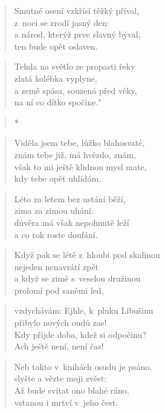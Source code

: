 \begin{verse}
Smutné osení vzkřísí těžký příval, \\
z~noci se zrodí jasný den: \\
a národ, kterýž prve slavný býval, \\
ten bude opět oslaven.
\end{verse}

\begin{verse}
Tehda na světlo ze propasti řeky \\
zlatá kolébka vyplyne, \\
a země spása, souzená před věky, \\
na ní co dítko spočine."
\end{verse}

\begin{verse}
*
\end{verse}

\begin{verse}
Viděla jsem tebe, lůžko blahosvaté, \\
znám tebe již, má hvězdo, znám, \\
však to mi ještě klidnou mysl mate, \\
kdy tebe opět uhlídám.
\end{verse}

\begin{verse}
Léto za letem bez ustání běží, \\
zima za zimou uhání: \\
důvěra má však nepohnutě leží \\
a co rok roste doufání.
\end{verse}

\begin{verse}
Když pak se létě z~hloubi pod skalinou \\
nejeden nenavrátí zpět \\
a když se zimě s~veselou družinou \\
prolomí pod saněmi led,
\end{verse}

\begin{verse}
vzdychávám: Ejhle, k~pluku Libušinu \\
přibylo nových oudů zas! \\
Kdy přijde doba, kdež si odpočinu? \\
Ach ještě není, není čas!
\end{verse}

\begin{verse}
Neb takto v~knihách osudu je psáno, \\
slyšte a vězte moji zvěst: \\
Až bude svítat ono blahé ráno, \\
vstanou i mrtví v~jeho čest.
\end{verse}

